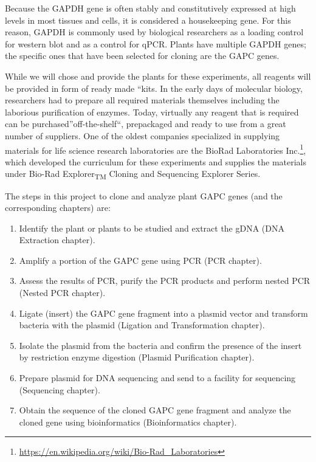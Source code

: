 \documentclass[]{book}
\providecommand{\tightlist}{%
  \setlength{\itemsep}{0pt}\setlength{\parskip}{0pt}}
\let\rmarkdownfootnote\footnote%
\def\footnote{\protect\rmarkdownfootnote}
\renewcommand{\href}[2]{#2\footnote{\url{#1}}}
\theoremstyle{definition}
\theoremstyle{definition}
\theoremstyle{definition}
\theoremstyle{remark}
\begin{document}
Because the GAPDH gene is often stably and constitutively expressed at
high levels in most tissues and cells, it is considered a housekeeping
gene. For this reason, GAPDH is commonly used by biological researchers
as a loading control for western blot and as a control for qPCR. Plants
have multiple GAPDH genes; the specific ones that have been selected for
cloning are the GAPC genes.

While we will chose and provide the plants for these experiments, all
reagents will be provided in form of ready made ``kits. In the early
days of molecular biology, researchers had to prepare all required
materials themselves including the laborious purification of enzymes.
Today, virtually any reagent that is required can be
purchased''off-the-shelf``, prepackaged and ready to use from a great
number of suppliers. One of the oldest companies specialized in
supplying materials for life science research laboratories are the
\href{https://en.wikipedia.org/wiki/Bio-Rad_Laboratories}{BioRad
Laboratories Inc.}, which developed the curriculum for these experiments
and supplies the materials under Bio-Rad Explorer\textsubscript{TM}
Cloning and Sequencing Explorer Series.

The steps in this project to clone and analyze plant GAPC genes (and the
corresponding chapters) are:

\begin{enumerate}
\def\labelenumi{\arabic{enumi}.}
\tightlist
\item
  Identify the plant or plants to be studied and extract the gDNA (DNA
  Extraction chapter).
\item
  Amplify a portion of the GAPC gene using PCR (PCR chapter).
\item
  Assess the results of PCR, purify the PCR products and perform nested
  PCR (Nested PCR chapter).
\item
  Ligate (insert) the GAPC gene fragment into a plasmid vector and
  transform bacteria with the plasmid (Ligation and Transformation
  chapter).
\item
  Isolate the plasmid from the bacteria and confirm the presence of the
  insert by restriction enzyme digestion (Plasmid Purification chapter).
\item
  Prepare plasmid for DNA sequencing and send to a facility for
  sequencing (Sequencing chapter).
\item
  Obtain the sequence of the cloned GAPC gene fragment and analyze the
  cloned gene using bioinformatics (Bioinformatics chapter).
\end{enumerate}
\end{document}
